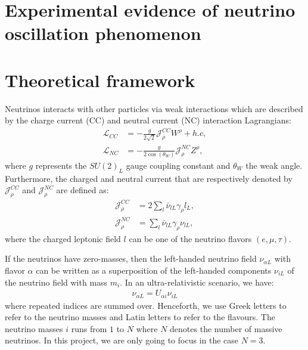 \documentclass[twocolumn,secnumarabic,amssymb, nobibnotes, aps, prd,10pt]{revtex4-1}
\begin{document}
\section{Experimental evidence of neutrino oscillation phenomenon}
\label{sec:experiment}


\section{Theoretical framework}
\label{sec:theory}

Neutrinos interacts with other particles via weak interactions which are described
by the charge current (CC) and neutral current (NC) interaction Lagrangians:
\begin{align}
\mathcal{L}_{CC} &= - \frac{g}{2 \sqrt{2}} \mathcal{J}^{CC}_\rho W^\rho + h.c, \\
\mathcal{L}_{NC} &= - \frac{g}{2 \cos(\theta_W)} \mathcal{J}^{NC}_\rho Z^\rho,
\end{align}
where $g$ represents the $SU(2)_L$ gauge coupling constant and $\theta_W$ the weak
angle. Furthermore, the charged and neutral current that are respectively denoted
by $\mathcal{J}^{CC}_\rho$ and $\mathcal{J}^{NC}_\rho$ are defined as:
\begin{align}
\mathcal{J}^{CC}_\rho &= 2 \sum_{l} \bar{\nu}_{lL} \gamma_\rho l_L, \\
\mathcal{J}^{NC}_\rho &= \sum_{l} \bar{\nu}_{lL} \gamma_\rho \nu_{lL},
\end{align}
where the charged leptonic field $l$ can be one of the neutrino flavors $(e, \mu, \tau)$.

If the neutrinos have zero-masses, then the left-handed neutrino field $\nu_{\alpha L}$
with flavor $\alpha$ can be written as a superposition of the left-handed components
$\nu_{iL}$ of the neutrino field with mass $m_i$. In an ultra-relativistic scenario, we
have:
\begin{align}
\nu_{\alpha L} = U_{\alpha i} \nu_{i L}
\label{eq:superposition}
\end{align} 
where repeated indices are summed over. Henceforth, we use Greek letters to refer to
the neutrino masses and Latin letters to refer to the flavours. The neutrino masses
$i$ runs from $1$ to $N$ where $N$ denotes the number of massive neutrinos. In this
project, we are only going to focus in the case $N=3$.
\end{document}
